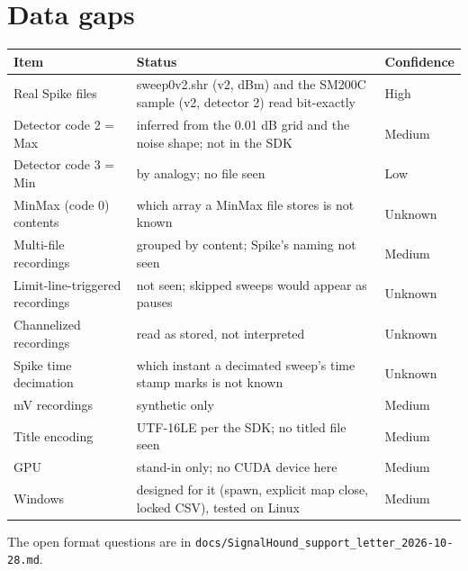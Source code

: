 \documentclass[11pt,a4paper]{article}
\newcommand{\code}[1]{\texttt{#1}}
\begin{document}
\section{Data gaps}
\begin{longtable}{p{4.2cm}p{8.6cm}l}
\toprule
\textbf{Item} & \textbf{Status} & \textbf{Confidence}\\
\midrule
\endhead
Real Spike files & sweep0v2.shr (v2, dBm) and the SM200C sample (v2, detector 2) read bit-exactly & High\\
Detector code 2 = Max & inferred from the 0.01 dB grid and the noise shape; not in the SDK & Medium\\
Detector code 3 = Min & by analogy; no file seen & Low\\
MinMax (code 0) contents & which array a MinMax file stores is not known & Unknown\\
Multi-file recordings & grouped by content; Spike's naming not seen & Medium\\
Limit-line-triggered recordings & not seen; skipped sweeps would appear as pauses & Unknown\\
Channelized recordings & read as stored, not interpreted & Unknown\\
Spike time decimation & which instant a decimated sweep's time stamp marks is not known & Unknown\\
mV recordings & synthetic only & Medium\\
Title encoding & UTF-16LE per the SDK; no titled file seen & Medium\\
GPU & stand-in only; no CUDA device here & Medium\\
Windows & designed for it (spawn, explicit map close, locked CSV), tested on Linux & Medium\\
\bottomrule
\end{longtable}
The open format questions are in \code{docs/SignalHound\_support\_letter\_2026-10-28.md}.

\appendix
\end{document}
